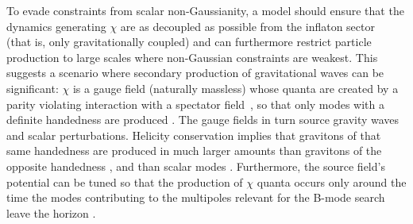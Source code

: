 To evade constraints from scalar non-Gaussianity, a model should ensure that the dynamics generating $\chi$ are as decoupled as possible from the inflaton sector~\cite{Barnaby:2012xt} (that is, only gravitationally coupled) and can furthermore restrict particle production to large scales where non-Gaussian constraints are weakest. This suggests a scenario where secondary production of gravitational waves can be significant: $\chi$ is a gauge field (naturally massless) whose quanta are created by a parity violating interaction with a spectator field~\cite{Cook:2011hg,Barnaby:2012xt}, so that only modes with a definite handedness are produced \cite{Anber:2006xt}. The gauge fields in turn source gravity waves and scalar perturbations. Helicity conservation implies that gravitons of that same handedness are produced in much larger amounts than gravitons of the opposite handedness \cite{Sorbo:2011rz}, and than scalar modes \cite{Barnaby:2012xt}. Furthermore, the source field's potential can be tuned so that the production of $\chi$ quanta occurs only around the time the modes contributing to the multipoles relevant for the B-mode search leave the horizon \cite{Namba:2015gja}.
